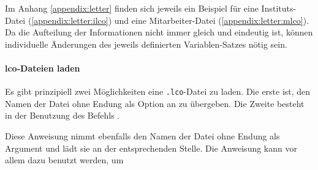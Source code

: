 Im Anhang \ref{appendix:letter} finden sich jeweils ein Beispiel für eine
Instituts-Datei (\ref{appendix:letter:ilco}) und eine Mitarbeiter-Datei
(\ref{appendix:letter:mlco}). Da die Aufteilung der Informationen nicht immer 
gleich und eindeutig ist, können individuelle Änderungen des jeweils definierten
Variablen-Satzes nötig sein.

\paragraph{lco-Dateien laden}

Es gibt prinzipiell zwei Möglichkeiten eine \texttt{.lco}-Datei zu laden.
Die erste ist, den Namen der Datei ohne Endung als Option an
 zu übergeben.
Die Zweite besteht in der Benutzung des Befehls .

\begin{Declaration}
\end{Declaration}

Diese Anweisung nimmt ebenfalls den Namen der Datei ohne Endung als
Argument und lädt sie an der entsprechenden Stelle.
Die Anweisung kann vor allem dazu benutzt werden, um 


